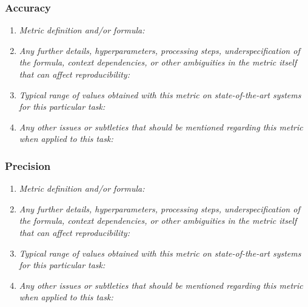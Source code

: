 \documentclass[a4paper,11pt]{article}
\begin{document}
        \subsubsection{Accuracy}
            \begin{enumerate}[label=\alph*.]
                \item \textit{Metric definition and/or formula:}
                \bigskip
                \item \textit{Any further details, hyperparameters, processing steps, underspecification of the formula, context dependencies, or other ambiguities in the metric itself that can affect reproducibility:}
                \bigskip
                \item \textit{Typical range of values obtained with this metric on state-of-the-art systems for this particular task:}
                \bigskip
                \item \textit{Any other issues or subtleties that should be mentioned regarding this metric when applied to this task:}
                \bigskip
            \end{enumerate}
        \subsubsection{Precision}
            \begin{enumerate}[label=\alph*.]
                \item \textit{Metric definition and/or formula:}
                \bigskip
                \item \textit{Any further details, hyperparameters, processing steps, underspecification of the formula, context dependencies, or other ambiguities in the metric itself that can affect reproducibility:}
                \bigskip
                \item \textit{Typical range of values obtained with this metric on state-of-the-art systems for this particular task:}
                \bigskip
                \item \textit{Any other issues or subtleties that should be mentioned regarding this metric when applied to this task:}
                \bigskip
            \end{enumerate}
\end{document}
